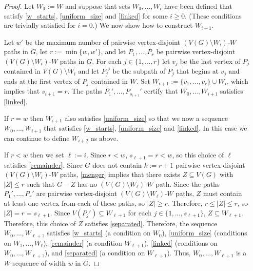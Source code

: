 \documentclass{patmorin}
\begin{document}
\begin{proof}
  Let $W_0:=W$ and suppose that sets $W_0,\ldots,W_{i}$ have been defined that satisfy \ref{w_starts}, \ref{uniform_size} and \ref{linked} for some $i\ge 0$.  (These conditions are trivially satisfied for $i=0$.)  We now show how to construct $W_{i+1}$.

  Let $w'$ be the maximum number of pairwise vertex-disjoint $(V(G)\setminus W_i)$-$W$ paths in $G$, let $r:=\min\{w,w'\}$, and let $P_1,\ldots,P_{r}$ be pairwise vertex-disjoint $(V(G)\setminus W_i)$-$W$ paths in $G$.  For each $j\in\{1,\ldots,r\}$ let $v_j$ be the last vertex of $P_j$ contained in $V(G)\setminus W_i$ and let $P_j'$ be the subpath of $P_j$ that begins at $v_j$ and ends at the first vertex of $P_j$ contained in $W$.  Set $W_{i+1}:=\{v_1,\ldots,v_r\}\cup W_i$, which implies that $s_{i+1}=r$.  The paths $P_1',\ldots,P_{s_{i+1}}'$ certify that $W_0,\ldots,W_{i+1}$ satisfies \ref{linked}.

  If $r=w$ then $W_{i+1}$ also satisfies \ref{uniform_size} so that we now a sequence $W_0,\ldots,W_{i+1}$ that satisfies \ref{w_starts}, \ref{uniform_size} and \ref{linked}.  In this case we can continue to define $W_{i+2}$ as above.

  If $r< w$ then we set $\ell:=i$. Since $r< w$, $s_{\ell+1}=r<w$, so this choice of $\ell$ satisfies \ref{remainder}.  Since $G$ does not contain $k:=r+1$ pairwise vertex-disjoint $(V(G)\setminus W_{i})$-$W$ paths, \cref{menger} implies that there exists $Z\subseteq V(G)$ with $|Z|\le r$ such that $G-Z$ has no $(V(G)\setminus W_{\ell})$-$W$ path.  Since the paths $P_1',\ldots,P_{r}'$ are pairwise vertex-disjoint  $(V(G)\setminus W_{\ell})$-$W$ paths, $Z$ must contain at least one vertex from each of these paths, so $|Z|\ge r$. Therefore, $r\le |Z|\le r$, so $|Z|=r=s_{\ell+1}$.  Since $V(P_j')\subseteq W_{\ell+1}$ for each $j\in\{1,\ldots,s_{\ell+1}\}$, $Z\subseteq W_{\ell+1}$.  Therefore, this choice of $Z$ satisfies \ref{separated}.  Therefore, the sequence $W_0,\ldots,W_{\ell+1}$ satisfies \ref{w_starts} (a condition on $W_0$), \ref{uniform_size} (conditions on $W_1,\ldots,W_{\ell}$), \ref{remainder} (a condition $W_{\ell+1}$), \ref{linked} (conditions on $W_0,\ldots,W_{\ell+1}$), and \ref{separated} (a condition on $W_{\ell+1}$).  Thus, $W_0,\ldots,W_{\ell+1}$ is a $W$-sequence of width $w$ in $G$.
\end{proof}

\end{document}
